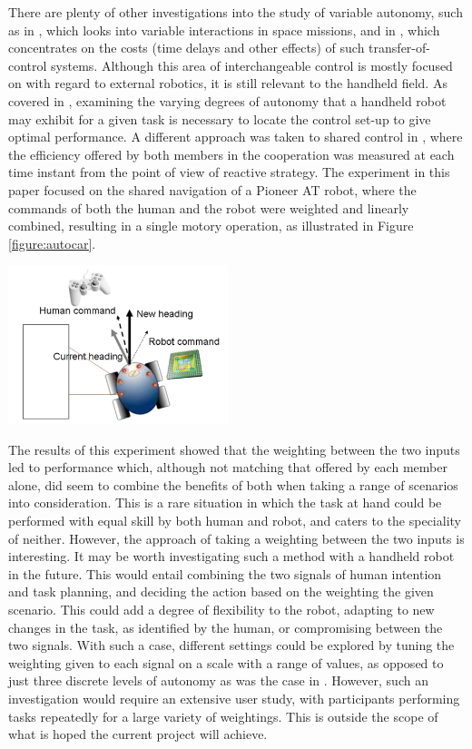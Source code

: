 \documentclass[11pt]{article}
\begin{document}
There are plenty of other investigations into the study of variable autonomy, such as in \cite{Dorais1999}, which looks into variable interactions in space missions, and in \cite{tambe2002}, which concentrates on the costs (time delays and other effects) of such transfer-of-control systems. Although this area of interchangeable control is mostly focused on with regard to external robotics, it is still relevant to the handheld field. As covered in \cite{GreggSmithDesign}, examining the varying degrees of autonomy that a handheld robot may exhibit for a given task is necessary to locate the control set-up to give optimal performance.
A different approach was taken to shared control in \cite{Poncela2009}, where the efficiency offered by both members in the cooperation was measured at each time instant from the point of view of reactive strategy. The experiment in this paper focused on the shared navigation of a Pioneer AT robot, where the commands of both the human and the robot were weighted and linearly combined, resulting in a single motory operation, as illustrated in Figure \ref{figure:autocar}.

\begin{center}
\includegraphics[width=0.48\textwidth]{autocar.png}
\label{figure:autocar}
\end{center}

The results of this experiment showed that the weighting between the two inputs led to performance which, although not matching that offered by each member alone, did seem to combine the benefits of both when taking a range of scenarios into consideration. This is a rare situation in which the task at hand could be performed with equal skill by both human and robot, and caters to the speciality of neither. However, the approach of taking a weighting between the two inputs is interesting. It may be worth investigating such a method with a handheld robot in the future. This would entail combining the two signals of human intention and task planning, and deciding the action based on the weighting the given scenario. This could add a degree of flexibility to the robot, adapting to new changes in the task, as identified by the human, or compromising between the two signals. With such a case, different settings could be explored by tuning the weighting given to each signal on a scale with a range of values, as opposed to just three discrete levels of autonomy as was the case in \cite{GreggSmithDesign}. However, such an investigation would require an extensive user study, with participants performing tasks repeatedly for a large variety of weightings. This is outside the scope of what is hoped the current project will achieve.
\end{document}

